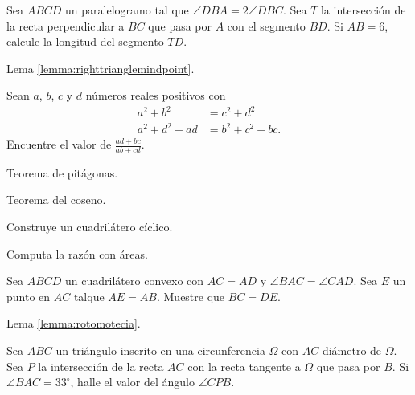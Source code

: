 \begin{problem}
Sea $ABCD$ un paralelogramo tal que $\angle DBA = 2\angle DBC$. Sea $T$ la intersección
de la recta perpendicular a $BC$ que pasa por $A$ con el segmento $BD$. Si
$AB = 6$, calcule la longitud del segmento $TD$.

\begin{hints}
	\begin{hint}
		Lema \ref{lemma:righttrianglemindpoint}.
	\end{hint}
\end{hints}
\end{problem}

\begin{problem}
Sean $a$, $b$, $c$ y $d$ números reales positivos con
\begin{align*}
	a^2 + b^2      & =       c^2 + d^2  \\
	a^2 + d^2 - ad & =  b^2 + c^2 + bc.
\end{align*}
Encuentre el valor de $\frac{ad + bc}{ab + cd}$.

\begin{hints}
	\begin{hint}
		Teorema de pitágonas.
	\end{hint}

	\begin{hint}
		Teorema del coseno.
	\end{hint}

	\begin{hint}
		Construye un cuadrilátero cíclico.
	\end{hint}

	\begin{hint}
		Computa la razón con áreas.
	\end{hint}
\end{hints}
\end{problem}

\begin{problem}
Sea $ABCD$ un cuadrilátero convexo con
$AC = AD$ y $\angle BAC = \angle CAD$.
Sea $E$ un punto en $AC$ talque $AE = AB$.
Muestre que $BC = DE$.

\begin{hints}
	\begin{hint}
		Lema \ref{lemma:rotomotecia}.
	\end{hint}
\end{hints}
\end{problem}

\begin{problem}
Sea $ABC$ un triángulo inscrito en una circunferencia $\Omega$ con
$AC$ diámetro de $\Omega$. Sea $P$ la intersección de la recta $AC$ con
la recta tangente a $\Omega$ que pasa por $B$. Si $\angle BAC = 33^\circ$,
halle el valor del ángulo $\angle CPB$.
\end{problem}

